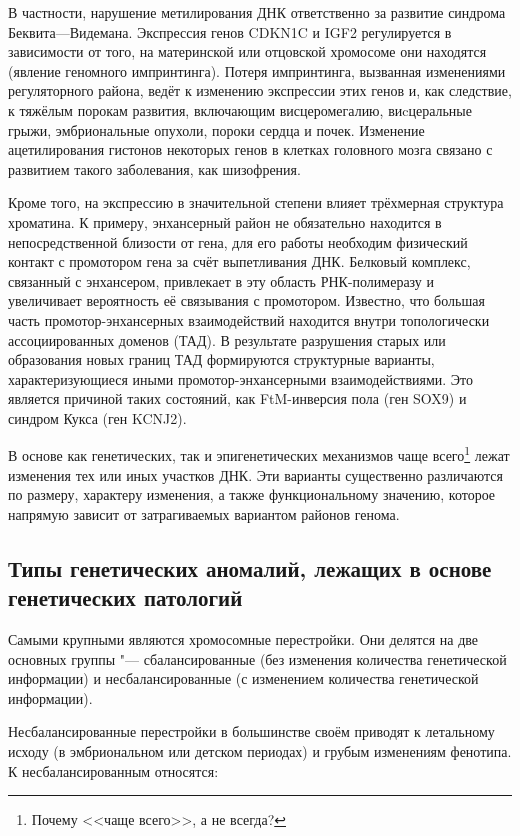 \documentclass[a4paper,12pt]{article}
\begin{document}
В частности, нарушение метилирования ДНК ответственно за развитие синдрома Беквита---Видемана.
Экспрессия генов CDKN1C и IGF2 регулируется в зависимости от того, на материнской или отцовской хромосоме они находятся (явление геномного импринтинга).
Потеря импринтинга, вызванная изменениями регуляторного района, ведёт к изменению экспрессии этих генов и, как следствие, к тяжёлым порокам развития, включающим висцеромегалию, виcцеральные грыжи, эмбриональные опухоли, пороки сердца и почек\cite{jin}.
Изменение ацетилирования гистонов некоторых генов в клетках головного мозга связано с развитием такого заболевания, как шизофрения\cite{tang}.

Кроме того, на экспрессию в значительной степени влияет трёхмерная структура хроматина.
К примеру, энхансерный район не обязательно находится в непосредственной близости от гена, для его работы необходим физический контакт с промотором гена за счёт выпетливания ДНК.
Белковый комплекс, связанный с энхансером, привлекает в эту область РНК-полимеразу и увеличивает вероятность её связывания с промотором.
Известно, что большая часть промотор-энхансерных взаимодействий находится внутри топологически ассоциированных доменов (ТАД).
В результате разрушения старых или образования новых границ ТАД формируются структурные варианты, характеризующиеся иными промотор-энхансерными взаимодействиями.
Это является причиной таких состояний, как FtM-инверсия пола (ген SOX9) и синдром Кукса (ген KCNJ2)\cite{spielmann}.

В основе как генетических, так и эпигенетических механизмов чаще всего\footnote{Почему <<чаще всего>>, а не всегда?} лежат изменения тех или иных участков ДНК.
Эти варианты существенно различаются по размеру, характеру изменения, а также функциональному значению, которое напрямую зависит от затрагиваемых вариантом районов генома.

\subsection{Типы генетических аномалий, лежащих в основе генетических патологий}

Самыми крупными являются хромосомные перестройки.
Они делятся на две основных группы "--- сбалансированные (без изменения количества генетической информации) и несбалансированные (с изменением количества генетической информации).

Несбалансированные перестройки в большинстве своём приводят к летальному исходу (в эмбриональном или детском периодах) и грубым изменениям фенотипа.
К несбалансированным относятся:
\end{document}
